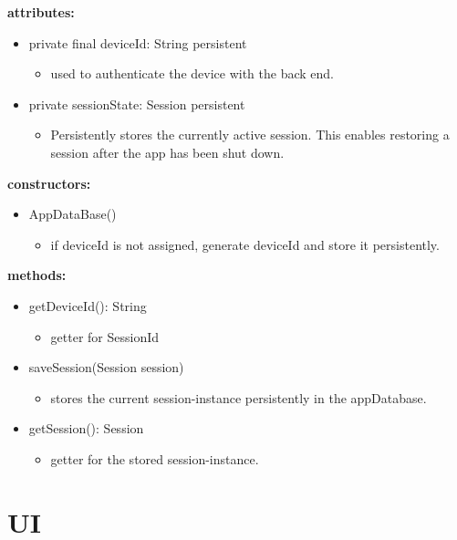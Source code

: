 \documentclass[oneside, ngerman]{sdqtechreport}
\begin{document}
\textbf{attributes:}
\begin{itemize}
    \item private final deviceId: String {persistent}
    \begin{itemize}
        \item used to authenticate the device with the back end.
    \end{itemize}
    \item private sessionState: Session {persistent}
    \begin{itemize}
        \item Persistently stores the currently active session. This enables restoring a session after the app has been shut down.
    \end{itemize}
\end{itemize}
\textbf{constructors:}
\begin{itemize}
    \item AppDataBase()
    \begin{itemize}
        \item if deviceId is not assigned, generate deviceId and store it persistently.
    \end{itemize}
\end{itemize}
\textbf{methods:}
\begin{itemize}
    \item getDeviceId(): String
    \begin{itemize}
        \item getter for SessionId
    \end{itemize}
    \item saveSession(Session session)
    \begin{itemize}
        \item stores the current session-instance persistently in the appDatabase.
    \end{itemize}
    \item getSession(): Session
    \begin{itemize}
        \item getter for the stored session-instance.
    \end{itemize}
\end{itemize}







\section{UI}
\label{sec:App:UI}
\end{document}
